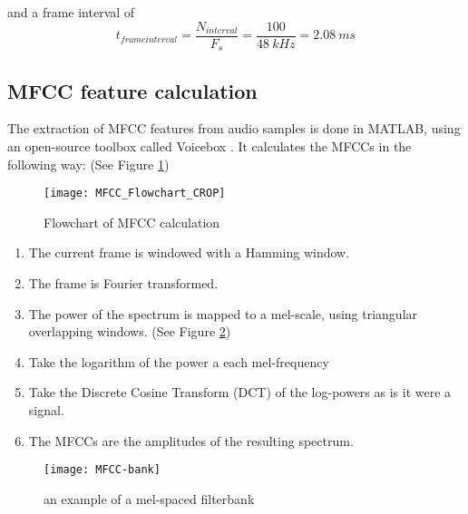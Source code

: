 and a frame interval of
\begin{equation}
t_{frame interval} = \dfrac{N_{interval}}{F_s} = \dfrac{100}{48\ kHz} = 2.08\ ms
\end{equation}
\newpage
\subsection{MFCC feature calculation}
The extraction of MFCC features from audio samples is done in MATLAB, using an open-source toolbox called Voicebox \cite{voicebox}.
It calculates the MFCCs in the following way: (See Figure \ref{fig:mfccFlow})

\begin{figure}[H]
\centering
\texttt{[image: MFCC\_Flowchart\_CROP]}
\caption{Flowchart of MFCC calculation}
\label{fig:mfccFlow}
\end{figure}

\begin{enumerate}

\item
The current frame is windowed with a Hamming window.

\item
The frame is Fourier transformed.

\item
The power of the spectrum is mapped to a mel-scale, using triangular overlapping windows. (See Figure \ref{fig:mfccBank})

\item
Take the logarithm of the power a each mel-frequency

\item
Take the Discrete Cosine Transform (DCT) of the log-powers as is it were a signal.

\item
The MFCCs are the amplitudes of the resulting spectrum.

\end{enumerate}

\begin{figure}[H]
\centering
\texttt{[image: MFCC-bank]}
\caption{an example of a mel-spaced filterbank}
\label{fig:mfccBank}
\end{figure}
